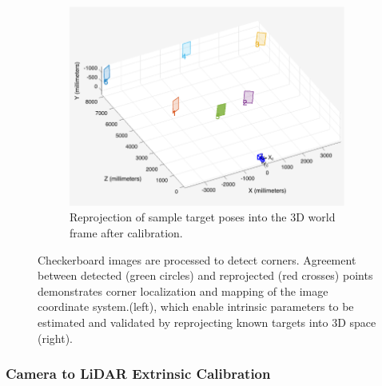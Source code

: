\documentclass{erauthesis}
\begin{document}
\begin{figure}[htbp]
{\begin{subfigure}[t]{0.625\textwidth}
        \includegraphics[width=\textwidth]{Images/cam_calib_2.png}
        \caption{Reprojection of sample target poses into the 3D world frame after calibration.}
        \label{fig:cam_calib_2}
    \end{subfigure}%
}
\caption{Checkerboard images are processed to detect corners. Agreement between detected (green circles) and reprojected (red crosses) points demonstrates corner localization and mapping of the image coordinate system.(left), which enable intrinsic parameters to be estimated and validated by reprojecting known targets into 3D space (right).}
\label{fig:cam_calib}
\end{figure}


\subsubsection{Camera to LiDAR Extrinsic Calibration} \label{camLidar_calib}

\end{document}
